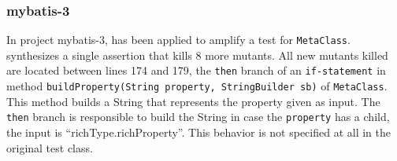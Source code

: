 \subsubsection{mybatis-3}


In project mybatis-3, \dspot has been applied to amplify a test for \texttt{MetaClass}. 
\dspot synthesizes a single assertion that kills 8 more mutants.
All new mutants killed are located between lines 174 and 179, \ie the \texttt{then} branch of an \texttt{if-statement} in method \texttt{buildProperty(String property, StringBuilder sb)} of \texttt{MetaClass}.
This method builds a String that represents the  property given as input. 
The \texttt{then} branch is responsible to build the String in case the \texttt{property} has a child, \eg the input is ``richType.richProperty''. 
This behavior is not specified at all in the original test class.

